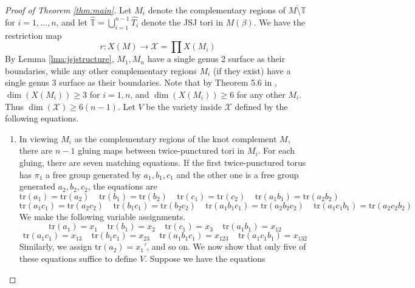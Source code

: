 \documentclass{article}
\theoremstyle{plain}
\theoremstyle{definition}
\theoremstyle{plain}
\theoremstyle{plain}
\theoremstyle{plain}
\theoremstyle{remark}
\theoremstyle{remark}
\theoremstyle{plain}
\theoremstyle{plain}
\begin{document}
\begin{proof}[Proof of Theorem \ref{thm:main}]
	Let $M_i$ denote the complementary regions of $\overline{M \setminus \mathbb{T}}$ for $i = 1, \dots, n$, and let $\widehat{\mathbb{T}} = \bigcup_{i=1}^{n-1}\hat{T_i}$ denote the JSJ tori in $M(\beta)$. We have the restriction map 
	\begin{equation}
		r: X(M) \to \mathcal{X} = \prod X(M_i)
	\end{equation}
	By Lemma \ref{lma:jsjstructure}, $M_1, M_n$ have a single genus 2 surface as their boundaries, while any other complementary regions $M_i$ (if they exist) have a single genus 3 surface as their boundaries. Note that by Theorem 5.6 in \cite{Thurston1979TheGA}, $\dim(X(M_i)) \geq 3$ for $i = 1, n$, and $\dim(X(M_i)) \geq 6$ for any other $M_i$. Thus $\dim(\mathcal{X}) \geq 6(n-1)$. Let $V$ be the variety inside $\mathcal{X}$ defined by the following equations.
	\begin{enumerate}
		\item In viewing $M_i$ as the complementary regions of the knot complement $M$, there are $n - 1$ gluing maps between twice-punctured tori in $M_i$. For each gluing, there are seven matching equations. If the first twice-punctured torus has $\pi_1$ a free group generated by $a_1, b_1, c_1$ and the other one is a free group generated $a_2, b_2, c_2$, the equations are
		\begin{equation}
			\text{tr}(a_1) = \text{tr}(a_2) \ \ \ \ \ \text{tr}(b_1) = \text{tr}(b_2) \ \ \ \ \ \text{tr}(c_1) = \text{tr}(c_2) \ \ \ \ \ \text{tr}(a_1b_1) = \text{tr}(a_2b_2)
		\end{equation}
		\begin{equation}
			\text{tr}(a_1c_1) = \text{tr}(a_2c_2) \ \ \ \ \ \text{tr}(b_1c_1) = \text{tr}(b_2c_2) \ \ \ \ \ \text{tr}(a_1b_1c_1) = \text{tr}(a_2b_2c_2) \ \ \ \ \ \text{tr}(a_1c_1b_1) = \text{tr}(a_2c_2b_2)
		\end{equation}
		We make the following variable assignments.
		\begin{equation}
			\text{tr}(a_1) = x_1 \ \ \ \ \ \text{tr}(b_1) = x_2 \ \ \ \ \ \text{tr}(c_1) = x_3 \ \ \ \ \ \text{tr}(a_1b_1) = x_{12}
		\end{equation}
		\begin{equation}
			\text{tr}(a_1c_1) = x_{13} \ \ \ \ \ \text{tr}(b_1c_1) = x_{23} \ \ \ \ \ \text{tr}(a_1b_1c_1) = x_{123} \ \ \ \ \ \text{tr}(a_1c_1b_1) = x_{132}
		\end{equation}
		Similarly, we assign $\text{tr}(a_2) = x_1'$, and so on. We now show that only five of these equations suffice to define $V$. Suppose we have the equations

\end{enumerate}
\end{proof}
\end{document}
